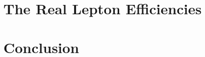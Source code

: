 \documentclass[hyperlinks]{outhesis}
\begin{document}
\chapter{The Real Lepton Efficiencies}
\label{chapter:real_lepton_efficiencies}
\graphicspath{{figures/real_lepton_efficiencies}}






\chapter{Conclusion}
\label{chapter:conclusion}
\graphicspath{{figures/conclusion/}}


\clearpage


%

\clearpage

\clearpage











%




% 
%
%
%


\end{document}

